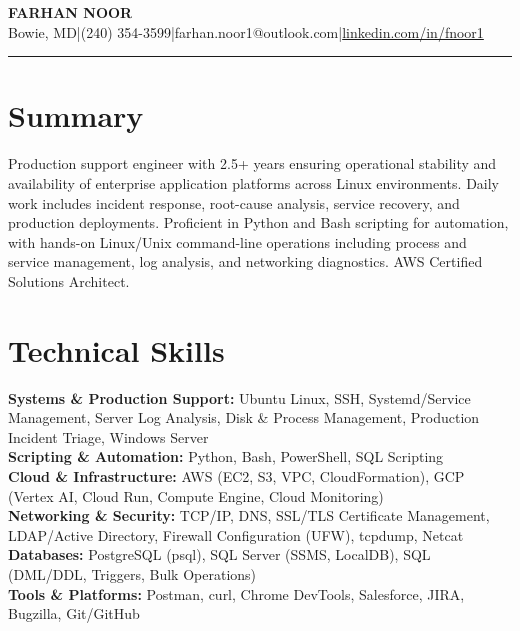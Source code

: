 \documentclass[9.5pt, letterpaper]{extarticle}
\newcommand{\skillline}[2]{%
  \textbf{#1:} #2
}
\begin{document}
\begin{center}
  {\fontsize{14}{16}\selectfont\bfseries FARHAN NOOR}\\[3pt]
  {\fontsize{9}{11}\selectfont Bowie, MD\enspace|\enspace(240) 354-3599\enspace|\enspace farhan.noor1@outlook.com\enspace|\enspace\href{https://linkedin.com/in/fnoor1}{linkedin.com/in/fnoor1}}
\end{center}
\vspace{-4pt}
{\color{headingblue}\rule{\textwidth}{1.2pt}}

\section{Summary}
Production support engineer with 2.5+ years ensuring operational stability and availability of enterprise application platforms across Linux environments. Daily work includes incident response, root-cause analysis, service recovery, and production deployments. Proficient in Python and Bash scripting for automation, with hands-on Linux/Unix command-line operations including process and service management, log analysis, and networking diagnostics. AWS Certified Solutions Architect.

\section{Technical Skills}
\skillline{Systems \& Production Support}{Ubuntu Linux, SSH, Systemd/Service Management, Server Log Analysis, Disk \& Process Management, Production Incident Triage, Windows Server}\\
\skillline{Scripting \& Automation}{Python, Bash, PowerShell, SQL Scripting}\\
\skillline{Cloud \& Infrastructure}{AWS (EC2, S3, VPC, CloudFormation), GCP (Vertex AI, Cloud Run, Compute Engine, Cloud Monitoring)}\\
\skillline{Networking \& Security}{TCP/IP, DNS, SSL/TLS Certificate Management, LDAP/Active Directory, Firewall Configuration (UFW), tcpdump, Netcat}\\
\skillline{Databases}{PostgreSQL (psql), SQL Server (SSMS, LocalDB), SQL (DML/DDL, Triggers, Bulk Operations)}\\
\skillline{Tools \& Platforms}{Postman, curl, Chrome DevTools, Salesforce, JIRA, Bugzilla, Git/GitHub}
\end{document}
